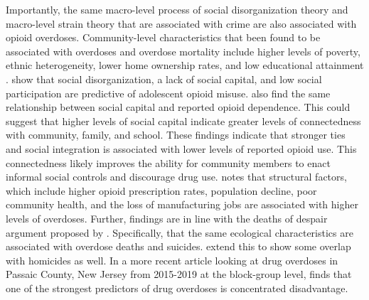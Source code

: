 Importantly, the same macro-level process of social disorganization theory and macro-level strain theory that are associated with crime are also associated with opioid overdoses. Community-level characteristics that been found to be associated with overdoses and overdose mortality include higher levels of poverty, ethnic heterogeneity, lower home ownership rates, and low educational attainment \parencite{chichester_pharmacies_2020, galea_income_2003, hannon_neighborhood_2006, ford_neighborhood_2017}. \textcite{ford_neighborhood_2017} show that social disorganization, a lack of social capital, and low social participation are predictive of adolescent opioid misuse. \textcite{winstanley_association_2008} also find the same relationship between social capital and reported opioid dependence. This could suggest that higher levels of social capital indicate greater levels of connectedness with community, family, and school. These findings indicate that stronger ties and social integration is associated with lower levels of reported opioid use. This connectedness likely improves the ability for community members to enact informal social controls and discourage drug use. \textcite{feldmeyer_community_2022} notes that structural factors, which include higher opioid prescription rates, population decline, poor community health, and the loss of manufacturing jobs are associated with higher levels of overdoses. Further, \textcite{feldmeyer_community_2022}findings are in line with the deaths of despair argument proposed by \textcite{case_rising_2015, case_mortality_2017}. Specifically, that the same ecological characteristics are associated with overdose deaths and suicides. \textcite{feldmeyer_community_2022} extend this to show some overlap with homicides as well. In a more recent article looking at drug overdoses in Passaic County, New Jersey from 2015-2019 at the block-group level, \textcite{piza_drug_2023} finds that one of the strongest predictors of drug overdoses is concentrated disadvantage. 

